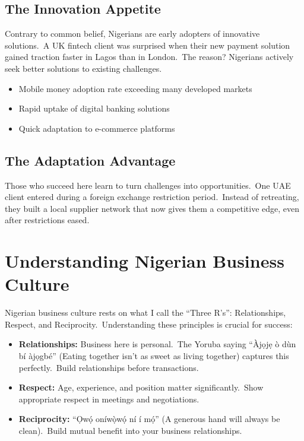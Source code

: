 \subsection{The Innovation Appetite}\label{subsec:the-innovation-appetite}
Contrary to common belief, Nigerians are early adopters of innovative solutions.\ A UK fintech client was surprised when their new payment solution gained traction faster in Lagos than in London.\ The reason?
Nigerians actively seek better solutions to existing challenges.

\begin{tcolorbox}[colback=white,colframe=primary,title=\textbf{Innovation Adoption Examples}]
\begin{itemize}
    \item Mobile money adoption rate exceeding many developed markets
    \item Rapid uptake of digital banking solutions
    \item Quick adaptation to e-commerce platforms
\end{itemize}
\end{tcolorbox}

\subsection{The Adaptation Advantage}\label{subsec:the-adaptation-advantage}
Those who succeed here learn to turn challenges into opportunities.\ One UAE client entered during a foreign exchange restriction period.\ Instead of retreating, they built a local supplier network that now gives them a competitive edge, even after restrictions eased.

\section{Understanding Nigerian Business Culture}\label{sec:understanding-nigerian-business-culture}

Nigerian business culture rests on what I call the ``Three R's'': Relationships, Respect, and Reciprocity.\ Understanding these principles is crucial for success:

\begin{tcolorbox}[colback=white,colframe=primarydark,title=\textbf{The Three R's of Nigerian Business}]
\begin{itemize}
    \item \textbf{Relationships:} Business here is personal.\ The Yoruba saying ``Àjọjẹ ò dùn bí àjọgbé'' (Eating together isn't as sweet as living together) captures this perfectly.\ Build relationships before transactions.
    \item \textbf{Respect:} Age, experience, and position matter significantly.\ Show appropriate respect in meetings and negotiations.
    \item \textbf{Reciprocity:} ``Ọwọ́ oníwọ̀wọ́ ní í mọ́'' (A generous hand will always be clean).\ Build mutual benefit into your business relationships.
\end{itemize}
\end{tcolorbox}

